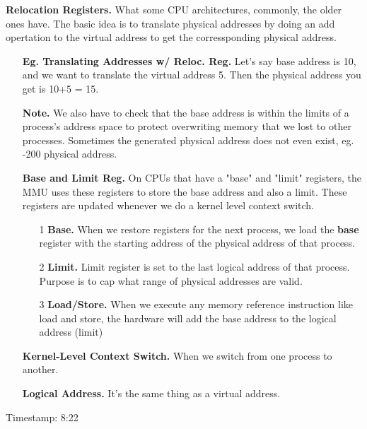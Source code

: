 \documentclass[12pt]{article}
\begin{document}
{\bf Relocation Registers.} {What some CPU architectures, commonly, the older ones have. The basic idea is to translate physical addresses by doing an add opertation to the virtual address to get the corressponding physical address. }
    \begin{enumerate}
        \item[]{\bf Eg. Translating Addresses w/ Reloc. Reg.} {Let's say base address is 10, and we want to translate the virtual address 5. Then the physical address you get is 10+5 = 15. }
        \item[]{\bf Note.} {We also have to check that the base address is within the limits of a process's address space to protect overwriting memory that we lost to other processes. Sometimes the generated physical address does not even exist, eg. -200 physical address. }
        \item[]{\bf Base and Limit Reg.} {On CPUs that have a "base" and "limit" registers, the MMU uses these registers to store the base address and also a limit. These registers are updated whenever we do a kernel level context switch.}
        \begin{enumerate}
            \item[1]{\bf Base.} {When we restore registers for the next process, we load the {\bf base} register with the starting address of the physical address of that process.}
            \item[2]{\bf Limit.} {Limit register is set to the last logical address of that process. Purpose is to cap what range of physical addresses are valid.}
            \item[3]{\bf Load/Store.} {When we execute any memory reference instruction like load and store, the hardware will add the base address to the logical address (limit)} 
        \end{enumerate}
        \item[]{\bf Kernel-Level Context Switch.} {When we switch from one process to another.} 
        \item[]{\bf Logical Address.} {It's the same thing as a virtual address.} 
    \end{enumerate}
Timestamp: 8:22
\end{document}
